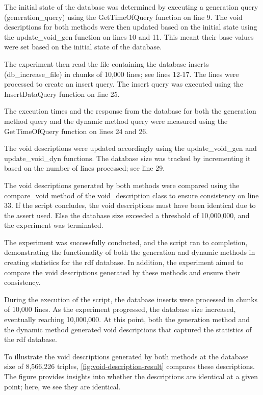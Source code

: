 The initial state of the database was determined by executing a generation query (generation\_query) using the GetTimeOfQuery function on line 9. The \gls{void} descriptions for both methods were then updated based on the initial state using the update\_void\_gen function on lines 10 and 11. This meant their base values were set based on the initial state of the database.

The experiment then read the file containing the database inserts (db\_increase\_file) in chunks of 10,000 lines; see lines 12-17. The lines were processed to create an insert query. The insert query was executed using the InsertDataQuery function on line 25.

The execution times and the response from the database for both the generation method query and the dynamic method query were measured using the GetTimeOfQuery function on lines 24 and 26.

The \gls{void} descriptions were updated accordingly using the update\_void\_gen and update\_void\_dyn functions. The database size was tracked by incrementing it based on the number of lines processed; see line 29.

The \gls{void} descriptions generated by both methods were compared using the compare\_void method of the void\_description class to ensure consistency on line 33.
If the script concludes, the \gls{void} descriptions must have been identical due to the assert used. Else the database size exceeded a threshold of 10,000,000, and the experiment was terminated.

The experiment was successfully conducted, and the script ran to completion, demonstrating the functionality of both the generation and dynamic methods in creating statistics for the  \gls{rdf} database. In addition, the experiment aimed to compare the \gls{void} descriptions generated by these methods and ensure their consistency.

During the execution of the script, the database inserts were processed in chunks of 10,000 lines. As the experiment progressed, the database size increased, eventually reaching 10,000,000. At this point, both the generation method and the dynamic method generated \gls{void} descriptions that captured the statistics of the  \gls{rdf} database.

To illustrate the \gls{void} descriptions generated by both methods at the database size of 8,566,226 triples, \autoref{fig:void-description-result} compares these descriptions. The figure provides insights into whether the descriptions are identical at a given point; here, we see they are identical.


